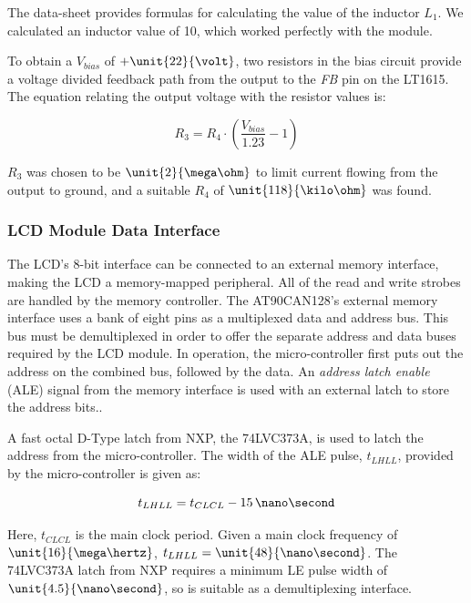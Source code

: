 The data-sheet provides formulas for calculating the value of the inductor $L_1$. We calculated an inductor value of \unit{10}{\micro\henry}, which worked perfectly with the module.

To obtain a $V_{bias}$ of $+\unit{22}{\volt}$, two resistors in the bias circuit provide a voltage divided feedback path from the output to the \emph{FB} pin on the LT1615. The equation relating the output voltage with the resistor values is:

\begin{equation}
R_{3}=R_{4}\cdot\left(\frac{V_{bias}}{1.23}-1\right)
\end{equation}

 $R_{3}$ was chosen to be $\unit{2}{\mega\ohm}$ to limit current flowing from the output to ground, and a suitable $R_{4}$ of $\unit{118}{\kilo\ohm}$ was found.

\subsubsection{LCD Module Data Interface\label{sec:lcd_module_data_interface}}

The LCD's 8-bit interface can be connected to an external memory interface, making the LCD a memory-mapped peripheral. All of the read and write strobes are handled by the memory controller. The AT90CAN128's external memory interface uses a bank of eight pins as a multiplexed data and address bus. This bus must be demultiplexed in order to offer the separate address and data buses required by the LCD module. In operation, the micro-controller first puts out the address on the combined bus, followed by the data. An \emph{address latch enable} (ALE) signal from the memory interface is used with an external latch to store the address bits.\cite{AT90CAN}.

A fast octal D-Type latch from NXP, the 74LVC373A, is used to latch the address from the micro-controller. The width of the ALE pulse, $t_{LHLL}$, provided by the micro-controller is given as:

\begin{equation}
t_{LHLL}=t_{CLCL}-15\, \nano\second
\end{equation}

Here, $t_{CLCL}$ is the main clock period. Given a main clock frequency of $\unit{16}{\mega\hertz}$, $t_{LHLL}=\unit{48}{\nano\second}$. The 74LVC373A latch from NXP requires a minimum LE pulse width of $\unit{4.5}{\nano\second}$, so is suitable as a demultiplexing interface.

